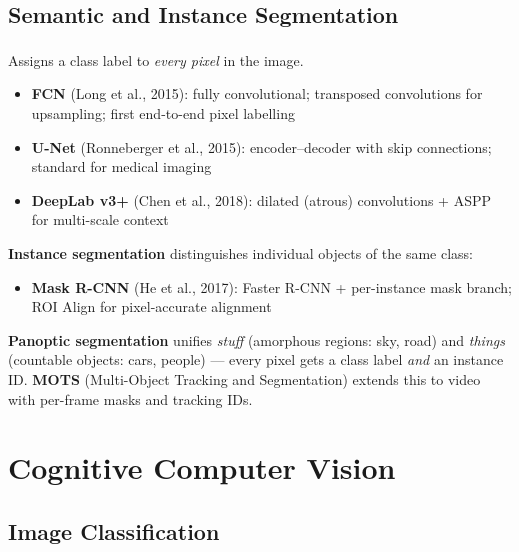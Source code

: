 \subsection{Semantic and Instance Segmentation}

\begin{tcbitemize}[ skin=sectionraster ]
    \tcbitem[title={Semantic Segmentation}, raster multicolumn=3]
    Assigns a class label to \emph{every pixel} in the image\textsuperscript{\cite[][pp.~110--112]{fleuretLittleBookDeep}}.
    \begin{itemize}
        \item \textbf{FCN} (Long et al., 2015): fully convolutional; transposed convolutions for upsampling; first end-to-end pixel labelling
        \item \textbf{U-Net} (Ronneberger et al., 2015): encoder--decoder with skip connections; standard for medical imaging
        \item \textbf{DeepLab v3+} (Chen et al., 2018): dilated (atrous) convolutions + ASPP for multi-scale context
    \end{itemize}

    \tcbitem[title={Instance and Panoptic Segmentation}, raster multicolumn=3]
    \textbf{Instance segmentation} distinguishes individual objects of the same class:
    \begin{itemize}
        \item \textbf{Mask R-CNN} (He et al., 2017): Faster R-CNN + per-instance mask branch; ROI Align for pixel-accurate alignment
    \end{itemize}
    \textbf{Panoptic segmentation} unifies \emph{stuff} (amorphous regions: sky, road) and \emph{things} (countable objects: cars, people) --- every pixel gets a class label \emph{and} an instance ID.
    \textbf{MOTS} (Multi-Object Tracking and Segmentation) extends this to video with per-frame masks and tracking IDs.
\end{tcbitemize}


\section{Cognitive Computer Vision}

\subsection{Image Classification}

